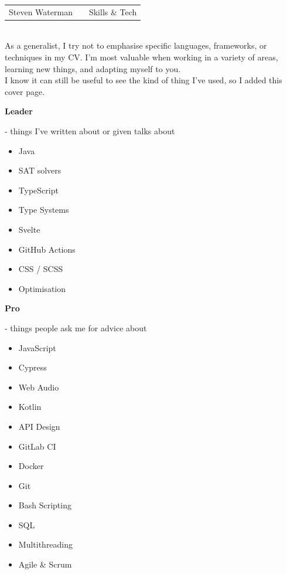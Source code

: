 \documentclass[hidelinks, 12pt, a4paper]{article}
\begin{document}
	\begin{huge}
		\begin{tabularx}{\linewidth}{l X r}
			Steven Waterman & & Skills \& Tech
		\end{tabularx}
	\end{huge}\\

	As a generalist, I try not to emphasise specific languages, frameworks, or techniques in my CV.
	I'm most valuable when working in a variety of areas, learning new things, and adapting myself to you.\\
	
	I know it can still be useful to see the kind of thing I've used, so I added this cover page.
	
	\vspace{16pt}
	
	\begin{large}
		\textbf{Leader}
	\end{large}- things I've written about or given talks about
		
	\begin{multicols}{4}
		\begin{itemize}
			\item Java
			\item SAT solvers
			
			\item TypeScript
			\item Type Systems
			
			\item Svelte
			\item GitHub Actions
			
			\item CSS / SCSS
			\item Optimisation
		\end{itemize}
	\end{multicols}

	\vspace{8pt}

	\begin{large}
		\textbf{Pro}
	\end{large}- things people ask me for advice about
	
	\begin{multicols}{4}
		\begin{itemize}
			\item JavaScript
			\item Cypress
			\item Web Audio
			
			\item Kotlin
			\item API Design
			\item GitLab CI
			
			\item Docker
			\item Git
			\item Bash Scripting
			
			\item SQL
			\item Multithreading
			\item Agile \& Scrum
		\end{itemize}
	\end{multicols}
\end{document}
